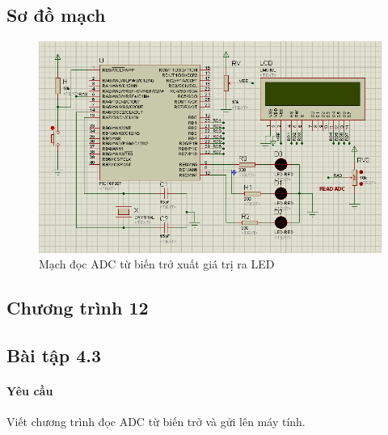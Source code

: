 \subsection*{Sơ đồ mạch}
\begin{figure}[!h]
\begin{center}
\includegraphics[scale=0.7]{bai-4/image/BAI-4-2}
\end{center}
\caption{Mạch đọc ADC từ biến trở xuất giá trị ra LED}
\vspace{1cm}
\end{figure}
\subsection*{Chương trình 12}

\subsection{Bài tập 4.3}
\label{Ex:4-3}
\paragraph{Yêu cầu}Viết chương trình đọc ADC từ biến trở và gửi lên máy tính.
